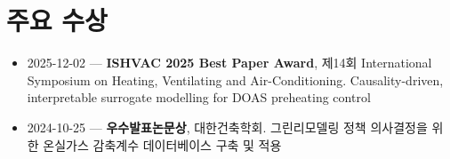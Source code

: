 \documentclass[10pt,a4paper]{article}
\begin{document}
\section*{주요 수상}
\begin{itemize}[leftmargin=*]
\item 2025-12-02 --- \textbf{ISHVAC 2025 Best Paper Award}, 제14회 International Symposium on Heating, Ventilating and Air-Conditioning. Causality-driven, interpretable surrogate modelling for DOAS preheating control
\item 2024-10-25 --- \textbf{우수발표논문상}, 대한건축학회. 그린리모델링 정책 의사결정을 위한 온실가스 감축계수 데이터베이스 구축 및 적용
\end{itemize}
\end{document}
